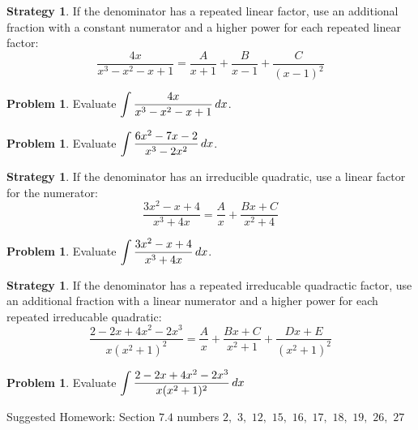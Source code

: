 \documentclass[letterpaper, twoside, 12pt]{book}
\theoremstyle{definition}
\theoremstyle{definition}
\newtheorem{problem}[theorem]{Problem}
\newtheorem{strategy}[theorem]{Strategy}
\newcommand{\ds}{\ensuremath{\displaystyle}}
\begin{document}
\vfill

\newpage

\begin{strategy}
  If the denominator has a repeated linear factor,
  use an additional fraction with a constant numerator and a higher power
  for each repeated linear factor:
  \[
    \frac{4x}{x^3-x^2-x+1}
      =
    \frac{A}{x+1} + \frac{B}{x-1} + \frac{C}{(x-1)^2}
  \]
\end{strategy}

\begin{problem}
 Evaluate $\ds \int \frac{4x}{x^3 - x^2 -x+1} \, dx$.
\end{problem}

\vfill

\begin{problem}
 Evaluate $\ds \int \frac{6x^2-7x-2}{x^3 - 2x^2} \, dx$.
\end{problem}

\vfill

\newpage

\begin{strategy}
  If the denominator has an irreducible quadratic, use a linear factor
  for the numerator:
  \[
    \frac{3x^2-x+4}{x^3 + 4x} = \frac{A}{x} + \frac{Bx+C}{x^2+4}
  \]
\end{strategy}

\begin{problem}
 Evaluate $\ds \int \frac{3x^2-x+4}{x^3 + 4x} \, dx$.
\end{problem}

\vfill

\begin{strategy}
  If the denominator has a repeated irreducable quadractic factor,
  use an additional fraction with a linear numerator and a higher power
  for each repeated irreducable quadratic:
  \[
    \frac{2-2x+4x^2-2x^3}{x(x^2+1)^2}
      =
    \frac{A}{x}+\frac{Bx+C}{x^2+1}+\frac{Dx+E}{(x^2+1)^2}
  \]
\end{strategy}

\begin{problem}
 Evaluate $\ds \int \frac{2-2x+4x^2-2x^3}{x(x^2+1)^2} \, dx$
\end{problem}

\vfill

\noindent Suggested Homework: Section $7.4$ numbers $2,$ $3,$ $12,$ $15,$ $16,$ $17,$ $18,$ $19,$ $26,$ $27$


\end{document}
